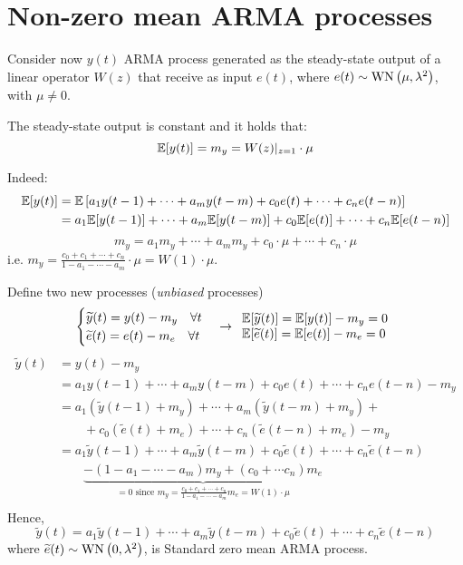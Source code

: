 \section{Non-zero mean ARMA processes}\label{sec:non-zero-mean-arma}
Consider now $y(t)$ ARMA process generated as the steady-state output of a linear operator $W(z)$ that receive as input $e(t)$, where $e(t) \sim \operatorname{WN}\left(\mu, \lambda^{2}\right)$, with $\mu\neq0$.

\begin{theorem}\label{thm:gain-theorem}
	The steady-state output is constant and it holds that:
	\[
		\mathbb{E}[y(t)]=m_{y}=W(z)|_{z=1} \cdot \mu
	\]
\end{theorem}

Indeed:
\begin{align*}
		\mathbb{E}[y(t)] &=\mathbb{E}\left[a_{1} y(t-1)+\cdots+a_{m} y(t-m)+c_{0} e(t)+\cdots+c_{n} e(t-n)\right] \\
		&=a_{1} \mathbb{E}[y(t-1)]+\cdots+a_{m} \mathbb{E}[y(t-m)]+c_{0} \mathbb{E}[e(t)]+\cdots+c_{n} \mathbb{E}[e(t-n)]
\end{align*}
$$
m_{y}=a_{1} m_{y}+\cdots+a_{m} m_{y}+c_{0} \cdot \mu+\cdots+c_{n} \cdot \mu
$$
i.e. $m_{y}=\frac{c_{0}+c_{1}+\cdots+c_{n}}{1-a_{1}-\cdots-a_{m}} \cdot \mu=W(1) \cdot \mu$.
	
Define two new processes (\emph{unbiased} processes)
$$
\begin{cases}
	\widetilde{y}(t)=y(t)-m_{y} \quad\forall t\\
	\widetilde{e}(t)=e(t)-m_{e} \quad\forall t
\end{cases}
\rightarrow \begin{array}{l}
	\mathbb{E}[\widetilde{y}(t)]=\mathbb{E}[y(t)]-m_{y}=0 \\
	\mathbb{E}[\widetilde{e}(t)]=\mathbb{E}[e(t)]-m_{e}=0
\end{array}
$$
\begin{align*}
	\tilde{y}(t)&= y(t)-m_{y}\\
	&= a_{1} y(t-1)+\cdots+a_{m} y(t-m)+c_{0} e(t)+\cdots+c_{n} e(t-n)-m_{y} \\
	&= a_{1}\left(\tilde{y}(t-1)+m_{y}\right)+\cdots+a_{m }\left(\tilde{y}(t-m)+m_{y}\right)+\\
	&\qquad +c_{0}\left(\tilde{e}(t)+m_{e}\right)+\cdots+c_{n}\left(\tilde{e}(t-n)+m_{e}\right)-m_{y} \\
	&= a_{1} \tilde{y}(t-1)+\cdots+a_{m} \tilde{y}(t-m)+c_{0} \tilde{e}(t)+\cdots+c_{n} \tilde{e}(t-n) \\
	&\qquad \underbrace{-\left(1-a_{1}-\cdots-a_{m}\right) m_{y}+\left(c_{0}+\cdots c_{n}\right) m_{e}}_{=0\text { since } m_{y}=\frac{c_{0}+c_{1}+\cdots+c_{n}}{1-a_{1}-\cdots-a_{m }} m_{e}=W(1) \cdot \mu} \\
\end{align*}
Hence,
$$
\tilde{y}(t)=a_{1} \tilde{y}(t-1)+\cdots+a_{m} \tilde{y}(t-m)+c_{0} \tilde{e}(t)+\cdots+c_{n} \tilde{e}(t-n)
$$
where $\widetilde{e}(t)\sim \operatorname{WN}\left(0, \lambda^{2}\right)$, is Standard zero mean ARMA process.

